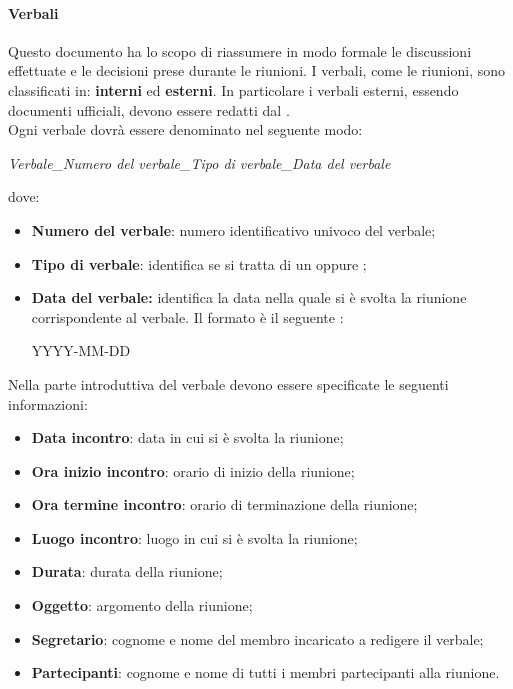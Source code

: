 \paragraph{Verbali}
Questo documento ha lo scopo di riassumere in modo formale le discussioni effettuate e le decisioni
prese durante le riunioni. I verbali, come le riunioni, sono classificati in:
\textbf{interni} ed \textbf{esterni}. In particolare i verbali esterni, essendo
documenti ufficiali, devono essere redatti dal \textit{\RdP}. \\
Ogni verbale dovrà essere denominato nel seguente modo:
\begin{center}
  \textit{{Verbale}\_{Numero del verbale}\_{Tipo di verbale}\_{Data del verbale}}
\end{center}
dove:
\begin{itemize}
  \item \textbf{Numero del verbale}: numero identificativo univoco del verbale;
  \item \textbf{Tipo di verbale}: identifica se si tratta di un \textit{\VI} oppure \textit{\VE};
  \item \textbf{Data del verbale:} identifica la data nella quale si è svolta la
  riunione corrispondente al verbale. Il formato è il seguente :
  \begin{center}
  YYYY-MM-DD
  \end{center}

\end{itemize}
Nella parte introduttiva del verbale devono essere specificate le seguenti informazioni:
\begin{itemize}
  \item \textbf{Data incontro}: data in cui si è svolta la riunione;
  \item \textbf{Ora inizio incontro}: orario di inizio della riunione;
  \item \textbf{Ora termine incontro}: orario di terminazione della riunione;
  \item \textbf{Luogo incontro}: luogo in cui si è svolta la riunione;
  \item \textbf{Durata}: durata della riunione;
  \item \textbf{Oggetto}: argomento della riunione;
  \item \textbf{Segretario}: cognome e nome del membro incaricato a redigere il
  verbale;
  \item \textbf{Partecipanti}: cognome e nome di tutti i membri partecipanti
  alla riunione.
\end{itemize}

